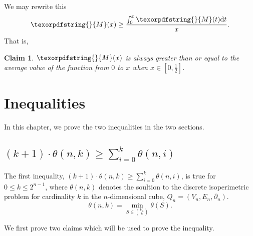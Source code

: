\documentclass[12pt]{ucthesis}
\theoremstyle{plain}
\newtheorem{claim}{Claim}
\theoremstyle{definition}
\newcommand{\takagi}{
  \texorpdfstring{\protect}{M}
}
\begin{document}
We may rewrite this
\begin{equation*}
\takagi(x) \ge \frac{\int_0^x \takagi(t) \mathrm{d}t}{x}.
\end{equation*}
That is,
\begin{claim}
\label{Claim 2}
$\takagi(x)$ is always greater than or equal to the average value of the function
from $0$ to $x$ when $x \in [0, \frac{1}{2}]$.
\end{claim}

\chapter{Inequalities}
\label{Chapter 4}

In this chapter, we prove the two inequalities in the two sections.

\section{
  \texorpdfstring{
    $(k + 1) \cdot \theta(n, k) \ge \sum_{i = 0}^k \theta(n, i)$
  }{
    (k + 1) theta(n, k) >= sum_\{i = 0\}\{k\} theta(n, i)
  }
}
\label{Section 4.1}

The first inequality, $(k + 1) \cdot \theta(n, k) \ge \sum_{i = 0}^k \theta(n, i)$,
is true for $0 \le k \le 2^{n - 1}$,
where $\theta(n, k)$ denotes the soultion to the discrete isoperimetric problem
for cardinality $k$ in the $n$-dimensional cube, $Q_n = (V_n, E_n, \partial_n)$.
\begin{equation*}
\theta(n, k) = \min_{S \in \binom{V_n}{k}} \theta(S).
\end{equation*}

We first prove two claims which will be used to prove the inequality.
\end{document}
